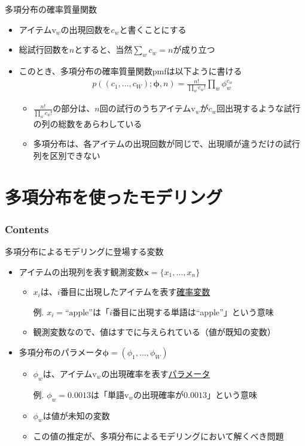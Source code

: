 \documentclass[aspectratio=169,unicode,dvipdfmx,14pt]{beamer}
\begin{document}
\begin{frame}{多項分布の確率質量関数}
\begin{itemize}
\item アイテム$\mbox{v}_w$の出現回数を$c_w$と書くことにする
\item 総試行回数を$n$とすると、当然$\sum_w c_w = n$が成り立つ
\item このとき、多項分布の確率質量関数pmfは以下ように書ける
\begin{align}
p((c_1,\ldots,c_W);\bm{\phi},n) = \frac{n!}{\prod_w c_w!}\prod_w\phi_w^{c_w}
\end{align}
\begin{itemize}
\item $\frac{n!}{\prod_w c_w!}$の部分は、$n$回の試行のうちアイテム$\mbox{v}_w$が$c_w$回出現するような試行の列の総数をあらわしている
\item 多項分布は、各アイテムの出現回数が同じで、出現順が違うだけの試行列を区別できない
\end{itemize}
\end{itemize}
\end{frame}


\section{多項分布を使ったモデリング}

\begin{frame}\frametitle{Contents}
\Large \tableofcontents[currentsection]
\end{frame}

\begin{frame}{多項分布によるモデリングに登場する変数}
\begin{itemize}
\item アイテムの出現列を表す観測変数$\bm{x}=\{x_1,\ldots,x_n\}$
\begin{itemize}
\item $x_i$は、$i$番目に出現したアイテムを表す\underline{確率変数}
\item[例.] $x_i = \mbox{``apple''}$は「$i$番目に出現する単語は``apple''」という意味
\item 観測変数なので、値はすでに与えられている（値が既知の変数）
\end{itemize}
\item 多項分布のパラメータ$\bm{\phi}=(\phi_1,\ldots,\phi_W)$
\begin{itemize}
\item $\phi_w$は、アイテム$\mbox{v}_w$の出現確率を表す\underline{パラメータ}
\item[例.] $\phi_w=0.0013$は「単語$\mbox{v}_w$の出現確率が$0.0013$」という意味
\item $\phi_w$は値が未知の変数
\item この値の推定が、多項分布によるモデリングにおいて解くべき問題
\end{itemize}
\end{itemize}
\end{frame}
\end{document}
